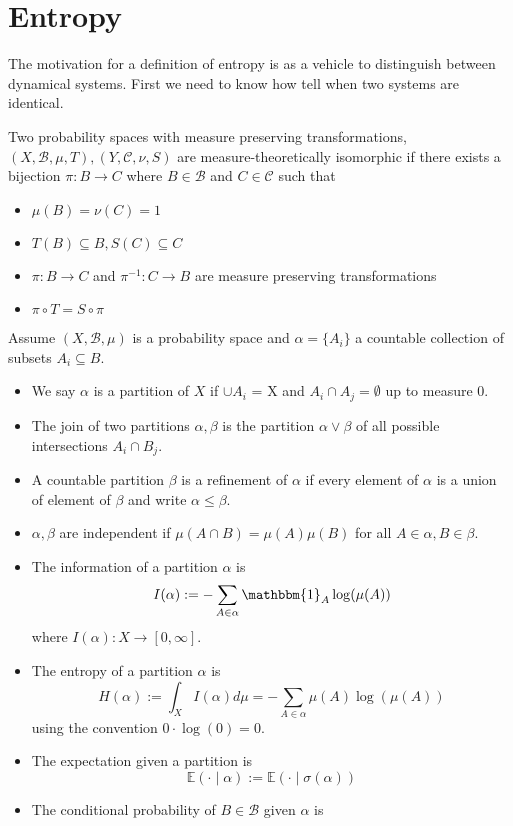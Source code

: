 \documentclass[11pt]{article}
\newcommand{\defeq}{:=}
\newcommand{\msrspc}{\ensuremath{(X,\mathcal{B},\mu)}}
\newcommand{\indic}[1]{\mathbbm{1}_{#1}}
\newcommand{\gvn}[2]{\ensuremath{\left(#1\;|\;#2\right)}}
\newcommand{\expg}[2]{\ensuremath{\mathbb{E}\gvn{#1}{#2}}}
\newenvironment{defin}
	{\begin{mdframed}[backgroundcolor=white, roundcorner=5pt, linewidth=1pt]}
	{\end{mdframed}}
\newcommand{\mdf}[1]{{\color{red} #1}}
\begin{document}
\section{Entropy}
The motivation for a definition of entropy is as a vehicle to distinguish between dynamical systems. First we need to know how tell when two systems are identical.
\begin{defin}
	Two probability spaces with measure preserving transformations, $(X,\mathcal{B},\mu,T),(Y,\mathcal{C}, \nu, S)$ are \mdf{measure-theoretically isomorphic} if there exists a bijection $\pi:B\to C$ where $B\in\mathcal{B}$ and $C\in\mathcal{C}$ such that
	\begin{itemize}
		\item $\mu(B)=\nu(C)=1$
		\item $T(B)\subseteq B, S(C)\subseteq C$
		\item $\pi: B\to C$ and $\pi^{-1}:C\to B$ are measure preserving transformations
		\item $\pi\circ T = S\circ\pi$
	\end{itemize}
Assume $\msrspc$ is a probability space and $\alpha=\{A_i\}$ a countable collection of subsets $A_i\subseteq B$.
\begin{itemize}
	\item We say $\alpha$ is a \mdf{partition} of $X$ if $\cup A_i$ = X and $A_i\cap A_j=\emptyset$ up to measure 0.
	\item The \mdf{join} of two partitions $\alpha,\beta$ is the partition $\alpha\vee\beta$ of all possible intersections $A_i\cap B_j$.
	\item A countable partition $\beta$ is a \mdf{refinement} of $\alpha$ if every element of $\alpha$ is a union of element of $\beta$ and write $\alpha\leq\beta$.
	\item $\alpha,\beta$ are \mdf{independent} if $\mu(A\cap B)=\mu(A)\mu(B)$ for all $A\in\alpha, B\in\beta$.
	\item The \mdf{information of a partition} $\alpha$ is
		$$I(\alpha)\defeq-\sum_{A\in\alpha}\indic{A}\log(\mu(A))$$
		where $I(\alpha):X\to[0,\infty]$.
	\item The \mdf{entropy of a partition} $\alpha$ is
		$$H(\alpha)\defeq\int_X I(\alpha)d\mu=-\sum_{A\in\alpha}\mu(A)\log(\mu(A))$$
		using the convention $0\cdot\log(0)=0$.
	\item The \mdf{expectation given a partition} is
		$$\expg{\cdot}{\alpha}\defeq\expg{\cdot}{\sigma(\alpha)}$$
	\item The \mdf{conditional probability} of $B\in\mathcal{B}$ given $\alpha$ is

\end{itemize}
\end{defin}
\end{document}
